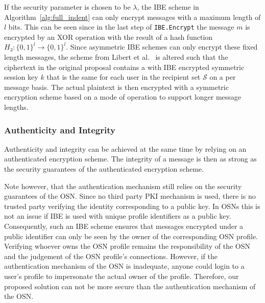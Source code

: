 If the security parameter is chosen to be $\lambda$, the IBE scheme in Algorithm~\ref{alg:full_indent} can only encrypt messages with a maximum length of $l$ bits. This can be seen since in the last step of \texttt{IBE.Encrypt} the message $m$ is encrypted by an XOR operation with the result of a hash function $H_3: \{ 0,1 \}^l \rightarrow \{ 0,1 \}^l$. Since asymmetric IBE schemes can only encrypt these fixed length messages, the scheme from Libert et al.~\cite{art:LibertPQ12} is altered such that the ciphertext in the original proposal contains a with IBE encrypted symmetric session key $k$ that is the same for each user in the recipient set $\mathcal{S}$ on a per message basis. The actual plaintext is then encrypted with a symmetric encryption scheme based on a mode of operation to support longer message lengths.

\subsubsection{Authenticity and Integrity}
\label{sec:authenticity_and_integrity}
Authenticity and integrity can be achieved at the same time by relying on an authenticated encryption scheme. The integrity of a message is then as strong as the security guarantees of the authenticated encryption scheme. 

Note however, that the authentication mechanism still relies on the security guarantees of the OSN. Since no third party PKI mechanism is used, there is no trusted party verifying the identity corresponding to a public key. In OSNs this is not an issue if IBE is used with unique profile identifiers as a public key. Consequently, such an IBE scheme ensures that messages encrypted under a public identifier can only be seen by the owner of the corresponding OSN profile. Verifying whoever owns the OSN profile remains the responsibility of the OSN and the judgement of the OSN profile's connections. However, if the authentication mechanism of the OSN is inadequate, anyone could login to a user's profile to impersonate the actual owner of the profile. Therefore, our proposed solution can not be more secure than the authentication mechanism of the OSN.


